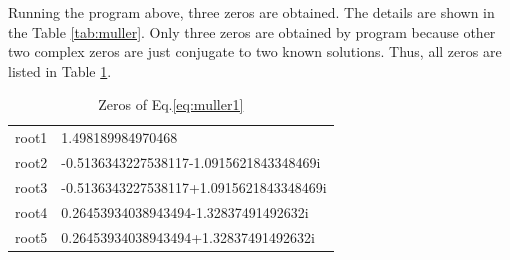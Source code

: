 \documentclass[preprint,12pt]{elsarticle}
\begin{document}
Running the program above, three zeros are obtained. The details are shown in the Table \ref{tab:muller}. Only three zeros are obtained by program because other two complex zeros are just conjugate to two known solutions. Thus, all zeros are listed in Table \ref{tab:muller0}.

\begin{table}[h]
\centering
\begin{tabular}{l|l}
\hline
root1 & 1.498189984970468\\
root2 & -0.5136343227538117-1.0915621843348469i\\
root3 & -0.5136343227538117+1.0915621843348469i\\
root4 & 0.26453934038943494-1.32837491492632i\\
root5 & 0.26453934038943494+1.32837491492632i\\
\hline
\end{tabular}
\caption{Zeros of Eq.\ref{eq:muller1}}
\label{tab:muller0}
\end{table}
\end{document}
